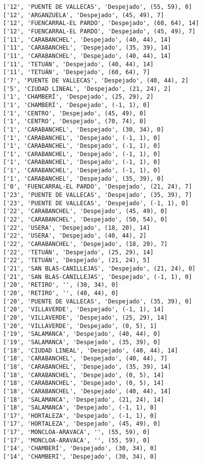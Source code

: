 \documentclass[11pt]{article}
\begin{document}
\begin{Verbatim}[commandchars=\\\{\}]
['12', 'PUENTE DE VALLECAS', 'Despejado', (55, 59), 0]
['12', 'ARGANZUELA', 'Despejado', (45, 49), 7]
['12', 'FUENCARRAL-EL PARDO', 'Despejado', (60, 64), 14]
['12', 'FUENCARRAL-EL PARDO', 'Despejado', (45, 49), 7]
['11', 'CARABANCHEL', 'Despejado', (40, 44), 14]
['11', 'CARABANCHEL', 'Despejado', (35, 39), 14]
['11', 'CARABANCHEL', 'Despejado', (40, 44), 14]
['11', 'TETUÁN', 'Despejado', (40, 44), 14]
['11', 'TETUÁN', 'Despejado', (60, 64), 7]
['7', 'PUENTE DE VALLECAS', 'Despejado', (40, 44), 2]
['5', 'CIUDAD LINEAL', 'Despejado', (21, 24), 2]
['1', 'CHAMBERÍ', 'Despejado', (25, 29), 2]
['1', 'CHAMBERÍ', 'Despejado', (-1, 1), 0]
['1', 'CENTRO', 'Despejado', (45, 49), 0]
['1', 'CENTRO', 'Despejado', (70, 74), 0]
['1', 'CARABANCHEL', 'Despejado', (30, 34), 0]
['1', 'CARABANCHEL', 'Despejado', (-1, 1), 0]
['1', 'CARABANCHEL', 'Despejado', (-1, 1), 0]
['1', 'CARABANCHEL', 'Despejado', (-1, 1), 0]
['1', 'CARABANCHEL', 'Despejado', (-1, 1), 0]
['1', 'CARABANCHEL', 'Despejado', (-1, 1), 0]
['1', 'CARABANCHEL', 'Despejado', (35, 39), 0]
['0', 'FUENCARRAL-EL PARDO', 'Despejado', (21, 24), 7]
['23', 'PUENTE DE VALLECAS', 'Despejado', (35, 39), 7]
['23', 'PUENTE DE VALLECAS', 'Despejado', (-1, 1), 0]
['22', 'CARABANCHEL', 'Despejado', (45, 49), 0]
['22', 'CARABANCHEL', 'Despejado', (50, 54), 0]
['22', 'USERA', 'Despejado', (18, 20), 14]
['22', 'USERA', 'Despejado', (40, 44), 2]
['22', 'CARABANCHEL', 'Despejado', (18, 20), 7]
['22', 'TETUÁN', 'Despejado', (25, 29), 14]
['22', 'TETUÁN', 'Despejado', (21, 24), 5]
['21', 'SAN BLAS-CANILLEJAS', 'Despejado', (21, 24), 0]
['21', 'SAN BLAS-CANILLEJAS', 'Despejado', (-1, 1), 0]
['20', 'RETIRO', '', (30, 34), 0]
['20', 'RETIRO', '', (40, 44), 0]
['20', 'PUENTE DE VALLECAS', 'Despejado', (35, 39), 0]
['20', 'VILLAVERDE', 'Despejado', (-1, 1), 14]
['20', 'VILLAVERDE', 'Despejado', (25, 29), 14]
['20', 'VILLAVERDE', 'Despejado', (0, 5), 1]
['19', 'SALAMANCA', 'Despejado', (40, 44), 0]
['19', 'SALAMANCA', 'Despejado', (35, 39), 0]
['18', 'CIUDAD LINEAL', 'Despejado', (40, 44), 14]
['18', 'CARABANCHEL', 'Despejado', (40, 44), 7]
['18', 'CARABANCHEL', 'Despejado', (35, 39), 14]
['18', 'CARABANCHEL', 'Despejado', (0, 5), 14]
['18', 'CARABANCHEL', 'Despejado', (0, 5), 14]
['18', 'CARABANCHEL', 'Despejado', (40, 44), 14]
['18', 'SALAMANCA', 'Despejado', (21, 24), 14]
['18', 'SALAMANCA', 'Despejado', (-1, 1), 0]
['17', 'HORTALEZA', 'Despejado', (-1, 1), 0]
['17', 'HORTALEZA', 'Despejado', (45, 49), 0]
['17', 'MONCLOA-ARAVACA', '', (55, 59), 0]
['17', 'MONCLOA-ARAVACA', '', (55, 59), 0]
['14', 'CHAMBERÍ', 'Despejado', (30, 34), 0]
['14', 'CHAMBERÍ', 'Despejado', (30, 34), 0]

\end{Verbatim}
\end{document}
